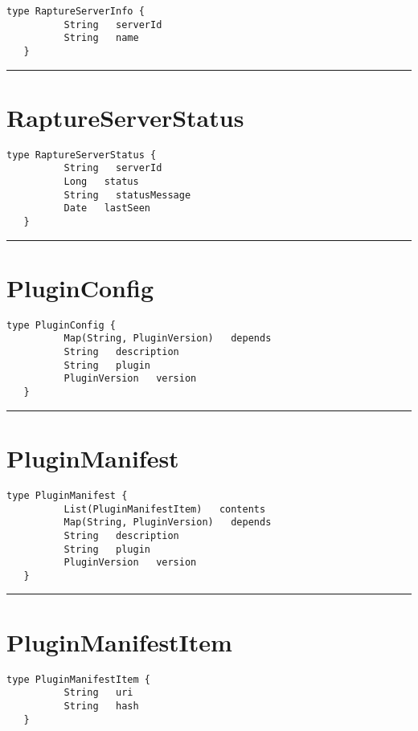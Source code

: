 \begin{lstlisting}[style=nonumbers]
   type RaptureServerInfo {
          String   serverId
          String   name
   }
\end{lstlisting}

\rule{12cm}{2pt}
\section{RaptureServerStatus}
\label{type:RaptureServerStatus}

\begin{lstlisting}[style=nonumbers]
   type RaptureServerStatus {
          String   serverId
          Long   status
          String   statusMessage
          Date   lastSeen
   }
\end{lstlisting}

\rule{12cm}{2pt}
\section{PluginConfig}
\label{type:PluginConfig}

\begin{lstlisting}[style=nonumbers]
   type PluginConfig {
          Map(String, PluginVersion)   depends
          String   description
          String   plugin
          PluginVersion   version
   }
\end{lstlisting}

\rule{12cm}{2pt}
\section{PluginManifest}
\label{type:PluginManifest}

\begin{lstlisting}[style=nonumbers]
   type PluginManifest {
          List(PluginManifestItem)   contents
          Map(String, PluginVersion)   depends
          String   description
          String   plugin
          PluginVersion   version
   }
\end{lstlisting}

\rule{12cm}{2pt}
\section{PluginManifestItem}
\label{type:PluginManifestItem}

\begin{lstlisting}[style=nonumbers]
   type PluginManifestItem {
          String   uri
          String   hash
   }
\end{lstlisting}

